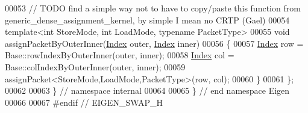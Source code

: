 \begin{DoxyCode}
00053   \textcolor{comment}{// TODO find a simple way not to have to copy/paste this function from generic\_dense\_assignment\_kernel,
       by simple I mean no CRTP (Gael)}
00054   \textcolor{keyword}{template}<\textcolor{keywordtype}{int} StoreMode, \textcolor{keywordtype}{int} LoadMode, \textcolor{keyword}{typename} PacketType>
00055   \textcolor{keywordtype}{void} assignPacketByOuterInner(\hyperlink{namespace_eigen_a62e77e0933482dafde8fe197d9a2cfde}{Index} outer, \hyperlink{namespace_eigen_a62e77e0933482dafde8fe197d9a2cfde}{Index} inner)
00056   \{
00057     \hyperlink{namespace_eigen_a62e77e0933482dafde8fe197d9a2cfde}{Index} row = Base::rowIndexByOuterInner(outer, inner); 
00058     \hyperlink{namespace_eigen_a62e77e0933482dafde8fe197d9a2cfde}{Index} col = Base::colIndexByOuterInner(outer, inner);
00059     assignPacket<StoreMode,LoadMode,PacketType>(row, col);
00060   \}
00061 \};
00062 
00063 \} \textcolor{comment}{// namespace internal}
00064 
00065 \} \textcolor{comment}{// end namespace Eigen}
00066 
00067 \textcolor{preprocessor}{#endif // EIGEN\_SWAP\_H}
\end{DoxyCode}
